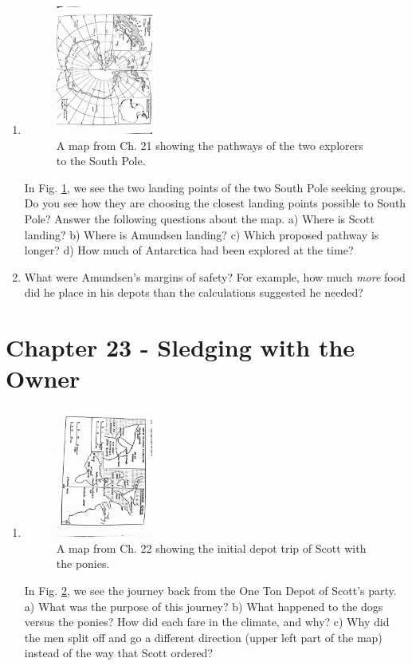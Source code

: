 \documentclass{article}
\begin{document}
\begin{enumerate}
\item
\begin{figure}[hb]
\centering
\includegraphics[width=0.3\textwidth,angle=90,trim=1cm 1cm 1cm 1cm,clip=true]{Map.jpg}
\caption{\label{fig:Map} A map from Ch. 21 showing the pathways of the two explorers to the South Pole.}
\end{figure}
In Fig. \ref{fig:Map}, we see the two landing points of the two South Pole seeking groups.  Do you see how they are choosing the closest landing points possible to South Pole?  Answer the following questions about the map.  a) Where is Scott landing?  b) Where is Amundsen landing?  c) Which proposed pathway is longer? d) How much of Antarctica had been explored at the time?
\item What were Amundsen's margins of safety?  For example, how much \textit{more} food did he place in his depots than the calculations suggested he needed? \\ \vspace{0.5cm}
\end{enumerate}

\section{Chapter 23 - Sledging with the Owner}
\begin{enumerate}
\item
\begin{figure}[hb]
\centering
\includegraphics[width=0.3\textwidth,angle=90,trim=1cm 1cm 1cm 1cm,clip=true]{Map2.jpg}
\caption{\label{fig:Map2} A map from Ch. 22 showing the initial depot trip of Scott with the ponies.}
\end{figure}
In Fig. \ref{fig:Map2}, we see the journey back from the One Ton Depot of Scott's party.  a) What was the purpose of this journey?  b) What happened to the dogs versus the ponies?  How did each fare in the climate, and why?  c) Why did the men split off and go a different direction (upper left part of the map) instead of the way that Scott ordered?
\end{enumerate}
\end{document}
